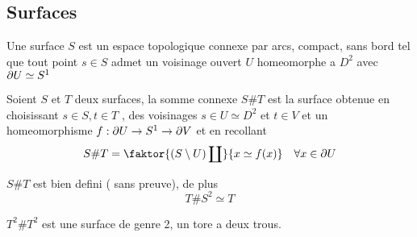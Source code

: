 \documentclass[../main.tex]{subfiles}
\begin{document}
\subsection{Surfaces}
\begin{defn}[Surface]
	Une surface $S$  est un espace topologique connexe par arcs, compact, sans bord tel que tout point $s\in S$ admet un voisinage ouvert $U$ homeomorphe a $D^{2}$ avec $\partial U \simeq S^{1}$ 
\end{defn}
\begin{defn}
	Soient $S$ et $T$ deux surfaces, la somme connexe $S\# T$ est la surface obtenue en choisissant $s\in S, t\in T$ , des voisinages $s\in U\simeq D^{2}$ et $t\in V$ et un homeomorphisme $f:\partial U \to S^{1}\to \partial V$ et en recollant
	\[ 
		S\# T = \faktor { ( S\setminus U) \coprod }{x\simeq f( x) } \quad \forall x \in \del U
	\]
	
\end{defn}
\begin{rmq}
$ S\# T$ est bien defini ( sans preuve), de plus
\[ 
T \# S^{2}\simeq T
\]

\end{rmq}

\begin{exemple}
$T^{2}\# T^{2}$ est une surface de genre 2, un tore a deux trous.
\end{exemple}


	



	
\end{document}
